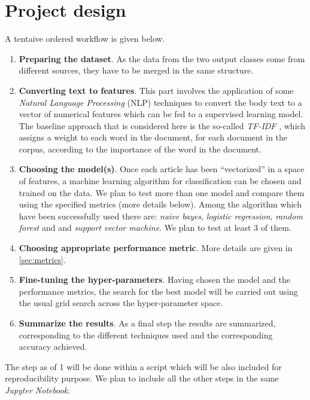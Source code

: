 \documentclass[a4paper,12pt]{article} %
\begin{document}
\section{Project design}
\label{sec:design}
A tentaive ordered workflow is given below.
\begin{enumerate}
\item \textbf{Preparing the dataset}. As the data from the two
  output classes come from different sources, they have to be merged
  in the same structure. 
\item \textbf{Converting text to features}. This part involves the
  application of some \textit{Natural Language Processing} (NLP) techniques to
  convert the body text to a vector of numerical features which can be
  fed to a supervised learning model. The baseline approach that is
  considered here is the so-called \textit{TF-IDF} \cite{TFIDF}, which
  assigns a weight to each word in the document, for each document in
  the corpus, according to the importance of the word in the
  document. 
\item \textbf{Choosing the model(s)}. Once each article has been
  ``vectorized'' in a space of features, a machine learning algorithm
  for classification can be chosen and trained on the data. 
We plan to test more than one model and compare them using the
specified metrics (more details below). Among the algorithm which have
been successfully used \cite{Genes, NYDSA} there are: \textit{naive bayes}, \textit{logistic
regression}, \textit{random forest} and and \textit{support vector
machine}. 
We plan to test at least 3 of them. 
\item \textbf{Choosing appropriate performance metric}. More details
  are given in \ref{sec:metrics}. 
\item \textbf{Fine-tuning the hyper-parameters}. Having chosen the
  model and the performance metrics, the search for the best model will
  be carried out using the usual grid search across the
  hyper-parameter space. 
\item{\textbf{Summarize the results}. As a final step the results are
    summarized, corresponding to the different techniques used and the
    corresponding accuracy achieved. }
\end{enumerate}
The step as of 1 will be done within a script which will
  be also included for reproducibility purpose. We plan to include all
  the other steps in the same \textit{Jupyter Notebook}. 


\nocite{*}

%
\renewcommand{\refname}{References}


\end{document}
